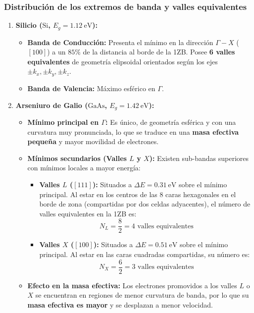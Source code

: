 \newpage
\subsubsection{Distribución de los extremos de banda y valles equivalentes}

\begin{enumerate}
    \item \textbf{Silicio ($\text{Si}$, $E_g = \SI{1.12}{\eV}$):}
    \begin{itemize}
        \item \textbf{Banda de Conducción:} Presenta el mínimo en la dirección $\Gamma-X$ ($[100]$) a un $85\%$ de la distancia al borde de la 1ZB. Posee \textbf{6 valles equivalentes} de geometría elipsoidal orientados según los ejes $\pm k_x, \pm k_y, \pm k_z$.
        \item \textbf{Banda de Valencia:} Máximo esférico en $\Gamma$.
    \end{itemize}

    \item \textbf{Arseniuro de Galio ($\text{GaAs}$, $E_g = \SI{1.42}{\eV}$):}
    \begin{itemize}
        \item \textbf{Mínimo principal en $\Gamma$:} Es único, de geometría esférica y con una curvatura muy pronunciada, lo que se traduce en una \textbf{masa efectiva pequeña} y mayor movilidad de electrones.
        \item \textbf{Mínimos secundarios (Valles $L$ y $X$):} Existen sub-bandas superiores con mínimos locales a mayor energía:
        \begin{itemize}
            \item \textbf{Valles $L$ ($[111]$):} Situados a $\Delta E = \SI{0.31}{\eV}$ sobre el mínimo principal. Al estar en los centros de las 8 caras hexagonales en el borde de zona (compartidas por dos celdas adyacentes), el número de valles equivalentes en la 1ZB es:
            \[
            N_L = \frac{8}{2} = 4 \text{ valles equivalentes}
            \]
            \item \textbf{Valles $X$ ($[100]$):} Situados a $\Delta E = \SI{0.51}{\eV}$ sobre el mínimo principal. Al estar en las caras cuadradas compartidas, su número es:
            \[
            N_X = \frac{6}{2} = 3 \text{ valles equivalentes}
            \]
        \end{itemize}
        \item \textbf{Efecto en la masa efectiva:} Los electrones promovidos a los valles $L$ o $X$ se encuentran en regiones de menor curvatura de banda, por lo que su \textbf{masa efectiva es mayor} y se desplazan a menor velocidad.
    \end{itemize}
\end{enumerate}

